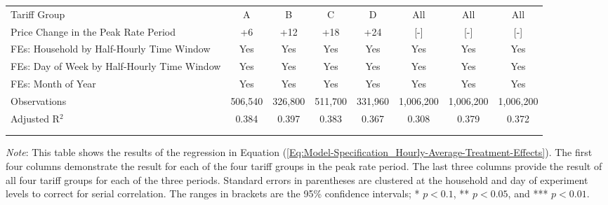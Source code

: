 {\begin{sidewaystable}[t!]
\begin{adjustbox}{scale = 0.80}
\begin{threeparttable}
\begin{tabular}{@{\extracolsep{1pt}}lccccccc}
                    Tariff Group & A & B & C & D & All & All & All \\
                    Price Change in the Peak Rate Period & +6 & +12 & +18 & +24 & [-] & [-] & [-] \\
                    FEs: Household by Half-Hourly Time Window & Yes & Yes & Yes & Yes & Yes & Yes & Yes \\
                    FEs: Day of Week by Half-Hourly Time Window & Yes & Yes & Yes & Yes & Yes & Yes & Yes \\
                    FEs: Month of Year & Yes & Yes & Yes & Yes & Yes & Yes & Yes \\
                    Observations & 506,540 & 326,800 & 511,700 & 331,960 & 1,006,200 & 1,006,200 & 1,006,200 \\
                    Adjusted R$^{2}$ & 0.384 & 0.397 & 0.383 & 0.367 & 0.308 & 0.379 & 0.372 \\
                    \\[-2.0ex]
                    \hline \hline
                    \\[-4.5ex]
                \end{tabular}
                \begin{tablenotes}[flushleft]
                    \footnotesize
                    \item
                    \item \textit{Note}: This table shows the results of the regression in Equation (\ref{Eq:Model-Specification_Hourly-Average-Treatment-Effects}). The first four columns demonstrate the result for each of the four tariff groups in the peak rate period. The last three columns provide the result of all four tariff groups for each of the three periods. Standard errors in parentheses are clustered at the household and day of experiment levels to correct for serial correlation. The ranges in brackets are the 95\% confidence intervals; * $p < 0.1$, ** $p < 0.05$, and *** $p < 0.01$.
                \end{tablenotes}
            \end{threeparttable}
        \end{adjustbox}
    \end{sidewaystable}
}
